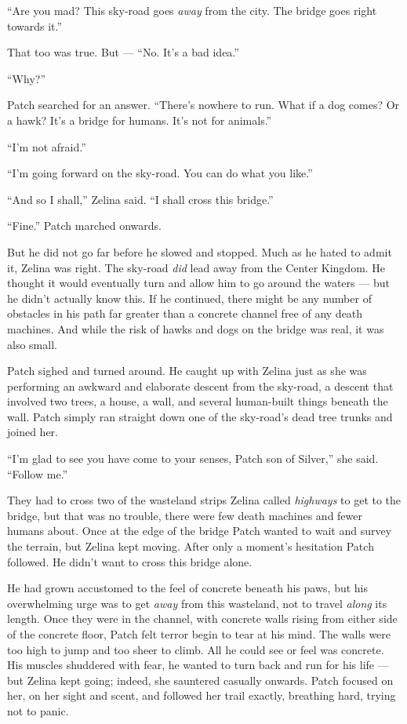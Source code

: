 \documentclass[ebook,oneside,openany,17pt]{memoir}
\begin{document}
“Are you mad? This sky-road goes \emph{away} from the city. The
bridge goes right towards it.”

That too was true. But — “No. It’s a bad idea.”

“Why?”

Patch searched for an answer. “There’s nowhere to run. What if a dog
comes? Or a hawk? It’s a bridge for humans. It’s not for animals.”

“I’m not afraid.”

“I’m going forward on the sky-road. You can do what you like.”

“And so I shall,” Zelina said. “I shall cross this bridge.”

“Fine.” Patch marched onwards.

But he did not go far before he slowed and stopped. Much as he hated
to admit it, Zelina was right. The sky-road \emph{did} lead away
from the Center Kingdom. He thought it would eventually turn and allow
him to go around the waters — but he didn’t actually know this. If he
continued, there might be any number of obstacles in his path far
greater than a concrete channel free of any death machines. And while
the risk of hawks and dogs on the bridge was real, it was also small.

Patch sighed and turned around. He caught up with Zelina just as she
was performing an awkward and elaborate descent from the sky-road, a
descent that involved two trees, a house, a wall, and several
human-built things beneath the wall. Patch simply ran straight down
one of the sky-road’s dead tree trunks and joined her.

“I’m glad to see you have come to your senses, Patch son of Silver,”
she said. “Follow me.”

They had to cross two of the wasteland strips Zelina called
\emph{highways} to get to the bridge, but that was no trouble, there
were few death machines and fewer humans about. Once at the edge of
the bridge Patch wanted to wait and survey the terrain, but Zelina
kept moving. After only a moment’s hesitation Patch followed. He
didn’t want to cross this bridge alone.

He had grown accustomed to the feel of concrete beneath his paws, but
his overwhelming urge was to get \emph{away} from this wasteland,
not to travel \emph{along} its length. Once they were in the
channel, with concrete walls rising from either side of the concrete
floor, Patch felt terror begin to tear at his mind. The walls were too
high to jump and too sheer to climb. All he could see or feel was
concrete. His muscles shuddered with fear, he wanted to turn back and
run for his life — but Zelina kept going; indeed, she sauntered
casually onwards. Patch focused on her, on her sight and scent, and
followed her trail exactly, breathing hard, trying not to panic.
\end{document}

